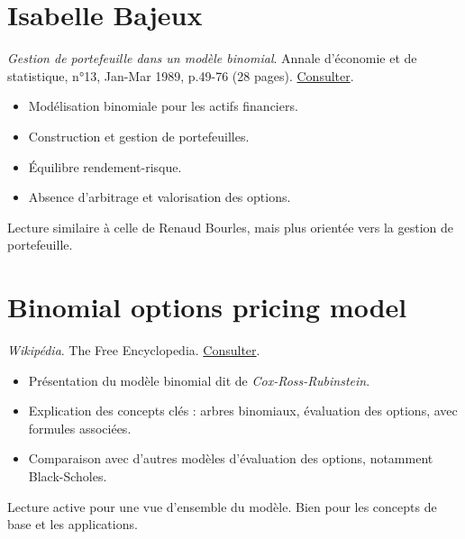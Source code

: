 \documentclass[a4paper,10pt]{article}
\begin{document}
\section*{Isabelle Bajeux}
{}
\textit{Gestion de portefeuille dans un modèle binomial}. Annale d'économie et de statistique, n°13, Jan-Mar 1989, p.49-76 (28 pages). \href{https://www.jstor.org/stable/20075729}{Consulter}.
\begin{itemize}
    \item Modélisation binomiale pour les actifs financiers.
    \item Construction et gestion de portefeuilles.
    \item Équilibre rendement-risque.
    \item Absence d’arbitrage et valorisation des options.
\end{itemize}
Lecture similaire à celle de Renaud Bourles, mais plus orientée vers la gestion de portefeuille.\\

\vspace{1em}

\section*{Binomial options pricing model}
{}
\textit{Wikipédia}. The Free Encyclopedia. \href{https://en.wikipedia.org/wiki/Binomial_options_pricing_model?oldid=215677262}{Consulter}.
\begin{itemize}
    \item Présentation du modèle binomial dit de \textit{Cox-Ross-Rubinstein}.
    \item Explication des concepts clés : arbres binomiaux, évaluation des options, avec formules associées.
    \item Comparaison avec d'autres modèles d'évaluation des options, notamment Black-Scholes.
\end{itemize}
Lecture active pour une vue d'ensemble du modèle. Bien pour les concepts de base et les applications.\\

\vspace{1em}
\end{document}
